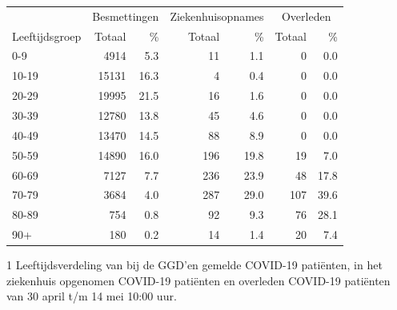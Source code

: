 \documentclass[
  english,
  man,floatsintext]{apa6}
\begin{document}
\begin{table}
\centering\begingroup\fontsize{11}{13}\selectfont

\begin{threeparttable}
\begin{tabular}{lrrrrrr}
\toprule
\multicolumn{1}{c}{ } & \multicolumn{2}{c}{Besmettingen} & \multicolumn{2}{c}{Ziekenhuisopnames} & \multicolumn{2}{c}{Overleden} \\
\cmidrule(l{3pt}r{3pt}){2-3} \cmidrule(l{3pt}r{3pt}){4-5} \cmidrule(l{3pt}r{3pt}){6-7}
Leeftijdsgroep & Totaal & \% & Totaal & \% & Totaal & \%\\
\midrule
0-9 & 4914 & 5.3 & 11 & 1.1 & 0 & 0.0\\
10-19 & 15131 & 16.3 & 4 & 0.4 & 0 & 0.0\\
20-29 & 19995 & 21.5 & 16 & 1.6 & 0 & 0.0\\
30-39 & 12780 & 13.8 & 45 & 4.6 & 0 & 0.0\\
40-49 & 13470 & 14.5 & 88 & 8.9 & 0 & 0.0\\
50-59 & 14890 & 16.0 & 196 & 19.8 & 19 & 7.0\\
60-69 & 7127 & 7.7 & 236 & 23.9 & 48 & 17.8\\
70-79 & 3684 & 4.0 & 287 & 29.0 & 107 & 39.6\\
80-89 & 754 & 0.8 & 92 & 9.3 & 76 & 28.1\\
90+ & 180 & 0.2 & 14 & 1.4 & 20 & 7.4\\
\bottomrule
\end{tabular}
\begin{tablenotes}
\item[1] Leeftijdsverdeling van bij de GGD’en gemelde COVID-19 patiënten, in het ziekenhuis opgenomen COVID-19 patiënten en overleden COVID-19 patiënten van 30 april t/m 14 mei 10:00 uur.
\end{tablenotes}
\end{threeparttable}
\endgroup{}
\end{table}

\newpage
\end{document}
